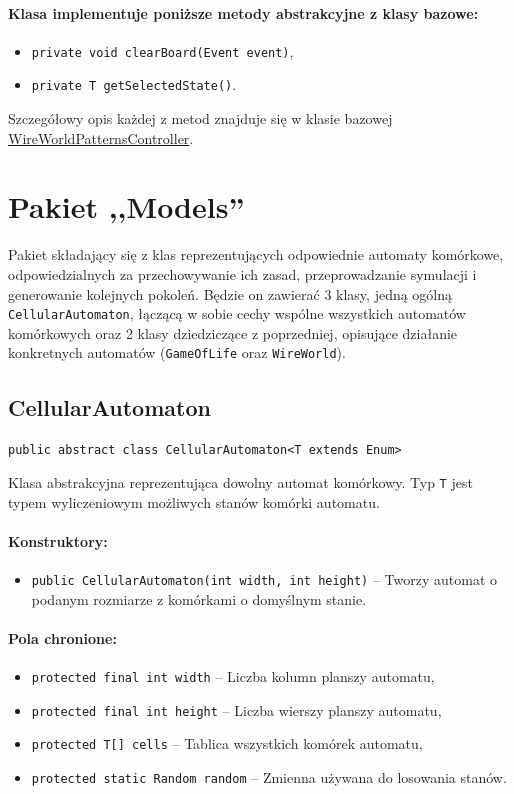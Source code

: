 \documentclass{report}
\begin{document}
\paragraph{Klasa implementuje poniższe metody abstrakcyjne z klasy bazowe:}
\begin{itemize}
 	\item \texttt{private void clearBoard(Event event)},
 	\item \texttt{private T getSelectedState()}.
\end{itemize}
Szczegółowy opis każdej z metod znajduje się w klasie bazowej \hyperref[subsec:cellularAutomaton]{WireWorldPatternsController}.
\section{Pakiet ,,Models''}
Pakiet składający się z klas reprezentujących odpowiednie automaty komórkowe, odpowiedzialnych za przechowywanie ich zasad, przeprowadzanie symulacji i generowanie kolejnych pokoleń. Będzie on zawierać 3 klasy, jedną ogólną \texttt{CellularAutomaton}, łączącą w sobie cechy wspólne wszystkich automatów komórkowych oraz 2 klasy dziedziczące z poprzedniej, opisujące działanie konkretnych automatów (\texttt{GameOfLife} oraz \texttt{WireWorld}).

\subsection{CellularAutomaton} \label{subsec:cellularAutomaton}
\texttt{public abstract class CellularAutomaton<T extends Enum>}

Klasa abstrakcyjna reprezentująca dowolny automat komórkowy.
Typ \texttt{T} jest typem wyliczeniowym możliwych stanów komórki automatu.

\paragraph{Konstruktory:}
\begin{itemize}
	\item \texttt{public CellularAutomaton(int width, int height)} -- Tworzy automat o podanym rozmiarze z komórkami o domyślnym stanie.
\end{itemize}

\paragraph{Pola chronione:}
\begin{itemize}
	\item \texttt{protected final int width} -- Liczba kolumn planszy automatu,
	\item \texttt{protected final int height} -- Liczba wierszy planszy automatu,
	\item \texttt{protected T[] cells} -- Tablica wszystkich komórek automatu,
	\item \texttt{protected static Random random} -- Zmienna używana do losowania stanów.
\end{itemize}
\end{document}
